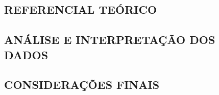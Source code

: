 \documentclass[
	article,			%
	11pt,				%
	oneside,			%
	a4paper,			%
	english,			%
	brazil,				%
	sumario=tradicional
	]{abntex2}
\begin{document}
\subsection{REFERENCIAL TEÓRICO}


\subsection{ANÁLISE E INTERPRETAÇÃO DOS DADOS}

% 

\subsection{CONSIDERAÇÕES FINAIS}

\postextual




%		
%		



\end{document}
